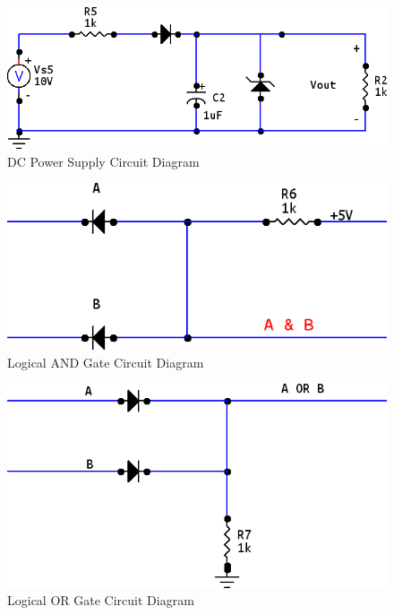 \documentclass[twocolumn,english]{IEEEtran}
\begin{document}
  \begin{figure}[htpb]
  \begin{centering}
  \begin{center}
  \includegraphics[width=\linewidth]{./acdc_circuit_diag.png}
  \caption{DC Power Supply Circuit Diagram}
  \label{fig:acdc_circuit_diag}
  \end{center}
  \par\end{centering}
  \end{figure}

  \begin{figure}[htpb]
  \begin{centering}
  \begin{center}
  \includegraphics[width=\linewidth]{./and_gate.png}
  \caption{Logical AND Gate Circuit Diagram}
  \label{fig:and_gate_diagram}
  \end{center}
  \par\end{centering}
  \end{figure}

  \begin{figure}[htpb]
  \begin{centering}
  \begin{center}
  \includegraphics[width=\linewidth]{./or_gate.png}
  \caption{Logical OR Gate Circuit Diagram}
  \label{fig:or_gate_diagram}
  \end{center}
  \par\end{centering}
  \end{figure}

%
%
\end{document}

